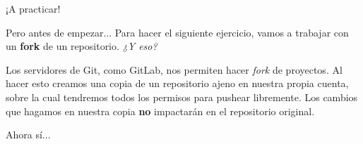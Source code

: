 \begin{frame}[t]{¡A practicar!}

    \pause
    \begin{block}{Pero antes de empezar...}
        Para hacer el siguiente ejercicio, vamos a trabajar con un \textbf{fork} de un repositorio.
        \pause\textit{¿Y eso?}

        \pause
        Los servidores de Git, como GitLab, nos permiten hacer \textit{fork} de proyectos. Al hacer
        esto creamos una copia de un repositorio ajeno en nuestra propia cuenta, sobre la cual
        tendremos todos los permisos para pushear libremente. Los cambios que hagamos en nuestra copia \textbf{no} impactarán
        en el repositorio original.
    \end{block}

    \pause
    \begin{center}
    \Large Ahora sí...
    \end{center}
\end{frame}

